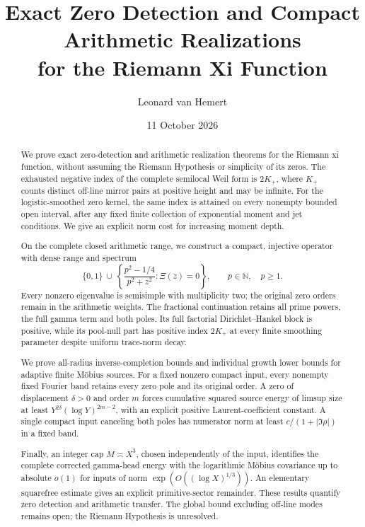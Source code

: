 \documentclass[11pt]{article}
\title{Exact Zero Detection and Compact Arithmetic Realizations\\
for the Riemann Xi Function}
\author{Leonard van Hemert}
\date{11 October 2026}
\theoremstyle{remark}\newtheorem{remark}[theorem]{Remark}
\begin{document}
\maketitle
\begin{abstract}
We prove exact zero-detection and arithmetic realization theorems for
the Riemann xi function, without assuming the Riemann Hypothesis or
simplicity of its zeros. The exhausted negative index of the complete
semilocal Weil form is \(2K_+\), where \(K_+\) counts distinct off-line
mirror pairs at positive height and may be infinite. For the
logistic-smoothed zero kernel, the same index is attained on every
nonempty bounded open interval, after any fixed finite collection
of exponential moment and jet conditions. We give an explicit
norm cost for increasing moment depth.

On the complete closed arithmetic range, we construct a compact,
injective operator with dense range and spectrum
\[
 \{0,1\}\ \cup\
 \left\{\frac{p^2-1/4}{p^2+z^2}:\Xi(z)=0\right\},
 \qquad p\in\mathbb N,\quad p\ge1.
\]
Every nonzero eigenvalue is semisimple with multiplicity two; the
original zero orders remain in the arithmetic weights. The
fractional continuation retains all prime powers, the full gamma
term and both poles. Its full factorial Dirichlet--Hankel block is
positive, while its pool-null part has positive index \(2K_+\) at every finite
smoothing parameter despite uniform trace-norm decay.

We prove all-radius inverse-completion bounds and individual
growth lower bounds for adaptive finite M\"obius sources. For a fixed
nonzero compact input, every nonempty fixed Fourier band retains
every zero pole and its original order. A zero of displacement
\(\delta>0\) and order \(m\) forces cumulative squared source energy
of limsup size at least \(Y^{2\delta}(\log Y)^{2m-2}\), with an
explicit positive Laurent-coefficient constant. A single compact
input canceling both poles has numerator norm at least
\(c/(1+|\Im\rho|)\) in a fixed band.

Finally, an integer cap \(M\asymp X^3\), chosen independently of
the input, identifies the complete corrected gamma-head energy
with the logarithmic M\"obius covariance up to absolute \(o(1)\)
for inputs of norm \(\exp(O((\log X)^{1/3}))\). An elementary
squarefree estimate gives an explicit primitive-sector remainder.
These results quantify zero detection and arithmetic transfer.
The global bound excluding off-line modes remains open; the
Riemann Hypothesis is unresolved.
\end{abstract}
\end{document}
